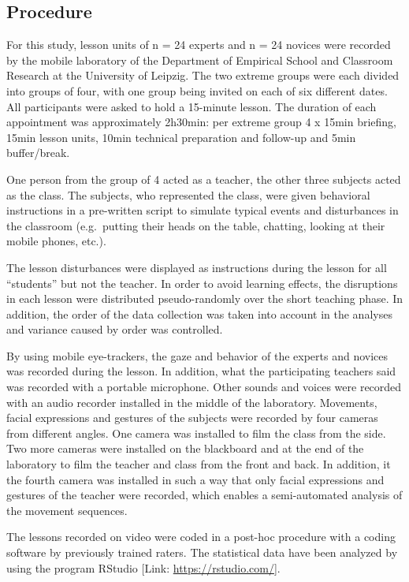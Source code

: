 \documentclass[
  english,
  man,floatsintext]{apa6}
\begin{document}
\hypertarget{procedure}{%
\subsection{Procedure}\label{procedure}}

For this study, lesson units of n = 24 experts and n = 24 novices were recorded by the mobile laboratory of the Department of Empirical School and Classroom Research at the University of Leipzig. The two extreme groups were each divided into groups of four, with one group being invited on each of six different dates. All participants were asked to hold a 15-minute lesson. The duration of each appointment was approximately 2h30min: per extreme group 4 x 15min briefing, 15min lesson units, 10min technical preparation and follow-up and 5min buffer/break.

One person from the group of 4 acted as a teacher, the other three subjects acted as the class. The subjects, who represented the class, were given behavioral instructions in a pre-written script to simulate typical events and disturbances in the classroom (e.g.~putting their heads on the table, chatting, looking at their mobile phones, etc.).

The lesson disturbances were displayed as instructions during the lesson for all \enquote{students} but not the teacher. In order to avoid learning effects, the disruptions in each lesson were distributed pseudo-randomly over the short teaching phase. In addition, the order of the data collection was taken into account in the analyses and variance caused by order was controlled.

By using mobile eye-trackers, the gaze and behavior of the experts and novices was recorded during the lesson. In addition, what the participating teachers said was recorded with a portable microphone. Other sounds and voices were recorded with an audio recorder installed in the middle of the laboratory. Movements, facial expressions and gestures of the subjects were recorded by four cameras from different angles. One camera was installed to film the class from the side. Two more cameras were installed on the blackboard and at the end of the laboratory to film the teacher and class from the front and back. In addition, it the fourth camera was installed in such a way that only facial expressions and gestures of the teacher were recorded, which enables a semi-automated analysis of the movement sequences.

The lessons recorded on video were coded in a post-hoc procedure with a coding software by previously trained raters. The statistical data have been analyzed by using the program RStudio {[}Link: \url{https://rstudio.com/}{]}.
\end{document}
